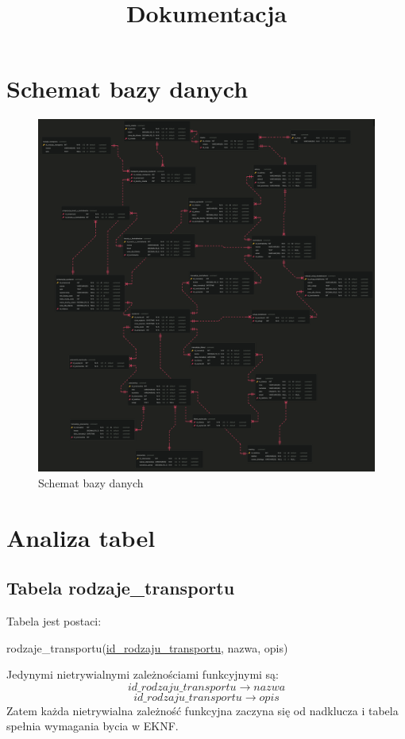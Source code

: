\documentclass[a4paper,12pt]{mwart}
\begin{document}
    \title{Dokumentacja}

\maketitle
\section{Schemat bazy danych}
\begin{figure}[h!]
    \centering

    \includegraphics[scale=0.1]{../obrazy/baza_danych_fullsize.png}
    \caption{Schemat bazy danych}
\end{figure}
\section{Analiza tabel}
\subsection{Tabela rodzaje\_transportu}
Tabela jest postaci:

rodzaje\_transportu(\underline{id\_rodzaju\_transportu}, nazwa, opis)

\noindent Jedynymi nietrywialnymi zależnościami funkcyjnymi są:
$$   id\_rodzaju\_transportu  \rightarrow nazwa $$
$$   id\_rodzaju\_transportu  \rightarrow opis$$
Zatem każda nietrywialna zależność funkcyjna zaczyna się od nadklucza i tabela  spełnia wymagania bycia w EKNF.
\end{document}
